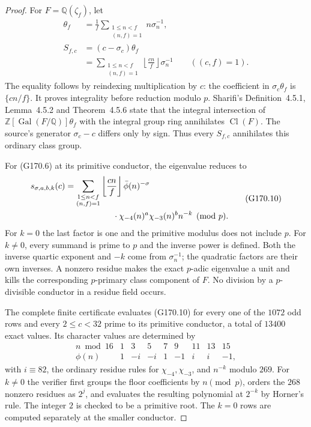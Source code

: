 \begin{proof}
For $F=\mathbb Q(\zeta_f)$, let
\[
 \begin{aligned}
 \theta_f&=\frac1f\sum_{\substack{1\leq n<f\\(n,f)=1}}
                              n\sigma_n^{-1},\\
 S_{f,c}&=(c-\sigma_c)\theta_f\\
       &=\sum_{\substack{1\leq n<f\\(n,f)=1}}
                   \left\lfloor\frac{cn}{f}\right\rfloor\sigma_n^{-1}
                   \qquad((c,f)=1).
 \end{aligned}
 \tag{G170.9}
\]
The equality follows by reindexing multiplication by $c$:
the coefficient in $\sigma_c\theta_f$ is $\{cn/f\}$.
It proves integrality before reduction modulo $p$.
Sharifi's Definition~4.5.1, Lemma~4.5.2 and Theorem~4.5.6
state that the integral intersection of
$\mathbb Z[\operatorname{Gal}(F/\mathbb Q)]\theta_f$ with
the integral group ring annihilates $\operatorname{Cl}(F)$.
The source's generator $\sigma_c-c$ differs only by sign.
Thus every $S_{f,c}$ annihilates this ordinary class group.

For (G170.6) at its primitive conductor, the eigenvalue reduces to
\[
 \begin{aligned}
 s_{\sigma,a,b,k}(c)
 &=\sum_{\substack{1\leq n<f\\(n,f)=1}}
 \left\lfloor\frac{cn}{f}\right\rfloor
 \bar\phi(n)^{-\sigma}\\
 &\hspace{20mm}\cdot\chi_{-4}(n)^a\chi_{-3}(n)^b n^{-k}
                      \pmod p.
 \end{aligned}
 \tag{G170.10}
\]
For $k=0$ the last factor is one and the primitive modulus
does not include $p$.  For $k\ne0$, every summand is prime
to $p$ and the inverse power is defined.
Both the inverse quartic exponent and $-k$ come from
$\sigma_n^{-1}$; the quadratic factors are their own inverses.
A nonzero residue makes the exact $p$-adic eigenvalue a unit
and kills the corresponding $p$-primary class component of $F$.
No division by a $p$-divisible conductor in a residue field occurs.

The complete finite certificate evaluates (G170.10) for every
one of the $1072$ odd rows and every $2\leq c<32$ prime to
its primitive conductor, a total of $13400$ exact values.
Its character values are determined by
\[
 \begin{array}{c|rrrrrrrr}
 n\bmod16&1&3&5&7&9&11&13&15\\ \hline
 \phi(n)&1&-i&-i&1&-1&i&i&-1,
 \end{array}
 \tag{G170.11}
\]
with $i\equiv82$, the ordinary residue rules for
$\chi_{-4},\chi_{-3}$, and $n^{-k}$ modulo $269$.
For $k\ne0$ the verifier first groups the floor coefficients
by $n\pmod p$, orders the $268$ nonzero residues as $2^j$,
and evaluates the resulting polynomial at $2^{-k}$ by Horner's rule.
The integer $2$ is checked to be a primitive root.
The $k=0$ rows are computed separately at the smaller conductor.


\end{proof}
